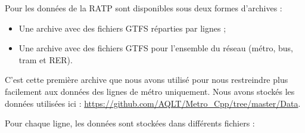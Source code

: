 \documentclass[,french]{article}
\providecommand{\tightlist}{%
  \setlength{\itemsep}{0pt}\setlength{\parskip}{0pt}}
\begin{document}
Pour les données de la RATP sont disponibles sous deux formes d'archives
:

\begin{itemize}
\tightlist
\item
  Une archive avec des fichiers GTFS réparties par lignes ;\\
\item
  Une archive avec des fichiers GTFS pour l'ensemble du réseau (métro,
  bus, tram et RER).
\end{itemize}

C'est cette première archive que nous avons utilisé pour nous
restreindre plus facilement aux données des lignes de métro uniquement.
Nous avons stockés les données utilisées ici :
\url{https://github.com/AQLT/Metro_Cpp/tree/master/Data}.

Pour chaque ligne, les données sont stockées dans différents fichiers :
\end{document}

